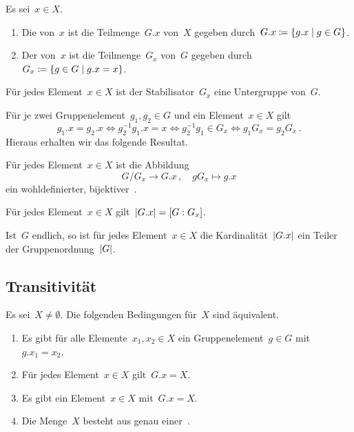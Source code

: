 \begin{definition}
  Es sei~$x \in X$.
  \begin{enumerate}
    \item
      Die  von~$x$ ist die Teilmenge~$G.x$ von~$X$ gegeben durch~$G.x \defined \{ g.x \suchthat g \in G \}$.
    \item
      Der  von~$x$ ist die Teilmenge~$G_x$ von~$G$ gegeben durch~$G_x \defined \{ g \in G \suchthat g.x = x \}$.
  \end{enumerate}
\end{definition}

\begin{proposition}
  Für jedes Element~$x \in X$ ist der Stabilisator~$G_x$ eine Untergruppe von~$G$.
\end{proposition}


Für je zwei Gruppenelement~$g_1, g_2 \in G$ und ein Element~$x \in X$ gilt
\[
  g_1.x = g_2.x
  \iff
  g_2^{-1} g_1.x = x
  \iff
  g_2^{-1} g_1 \in G_x
  \iff
  g_1 G_x = g_2 G_x \,.
\]
Hieraus erhalten wir das folgende Resultat.

\begin{corollary}
  \label{isomorphism theorem for G-sets}
  Für jedes Element~$x \in X$ ist die Abbildung
  \[
    G/G_x \to G.x \,,
    \quad
    g G_x \mapsto g.x
  \]
  ein wohldefinierter, bijektiver~.
\end{corollary}

\begin{corollary}
  Für jedes Element~$x \in X$ gilt~$\lvert G.x\rvert = [G : G_x]$.
\end{corollary}

\begin{corollary}
  Ist~$G$ endlich, so ist für jedes Element~$x \in X$ die Kardinalität~$\lvert G.x\rvert$ ein Teiler der Gruppenordnung~$\lvert G\rvert$.
\end{corollary}




\subsection{Transitivität}

\begin{proposition}
  \label{characterizations of transitive actions}
  Es sei~$X \neq \emptyset$.
  Die folgenden Bedingungen für~$X$ sind äquivalent.
  \begin{enumerate}
    \item
      Es gibt für alle Elemente~$x_1, x_2 \in X$ ein Gruppenelement~$g \in G$ mit~$g.x_1 = x_2$.
    \item
      Für jedes Element~$x \in X$ gilt~$G.x = X$.
    \item
      Es gibt ein Element~$x \in X$ mit~$G.x = X$.
    \item
      Die Menge~$X$ besteht aus genau einer~.
  \end{enumerate}
\end{proposition}


